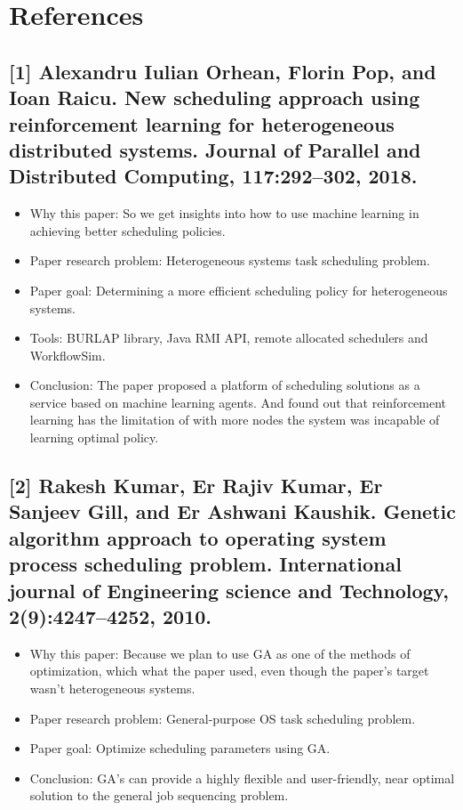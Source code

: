 \documentclass[twocolumn,11pt]{IEEEtran}
\begin{document}
    \section{References}
    \subsection*{[1] Alexandru Iulian Orhean,  Florin  Pop, and Ioan Raicu. New scheduling approach using reinforcement learning for heterogeneous distributed systems. Journal of Parallel and Distributed Computing, 117:292–302, 2018.}
    \begin{itemize}
        \item Why this paper: So we get insights into how to use machine learning in achieving better scheduling policies.
        \item Paper research problem: Heterogeneous systems task scheduling problem.
        \item Paper goal: Determining a more efficient scheduling policy for heterogeneous systems.
        \item Tools: BURLAP library, Java RMI API, remote allocated schedulers and WorkflowSim.
        \item Conclusion: The paper proposed a platform of scheduling solutions as a service based on machine learning agents. 
        And found out that reinforcement learning has the limitation of with more nodes the system was incapable of learning optimal policy.
    \end{itemize}

    \subsection*{[2] Rakesh Kumar, Er Rajiv Kumar, Er Sanjeev Gill, and Er Ashwani Kaushik. Genetic algorithm approach to operating system process scheduling problem. International journal of Engineering science and Technology, 2(9):4247–4252, 2010.}
    \begin{itemize}
        \item Why this paper: Because we plan to use GA as one of the methods of optimization, which what the paper used,
        even though the paper's target wasn't heterogeneous systems.
        \item Paper research problem: General-purpose OS task scheduling problem.
        \item Paper goal: Optimize scheduling parameters using GA.
        \item Conclusion: GA’s can provide a highly flexible and user-friendly, near optimal solution to the general job sequencing problem.
    \end{itemize}
\end{document}
